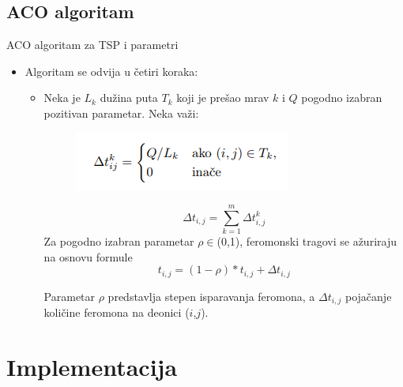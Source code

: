 \documentclass[11pt]{beamer}
\begin{document}
\subsection{ACO algoritam}
\begin{frame}{ACO algoritam za TSP i parametri}
\begin{itemize}
  		\item Algoritam se odvija u četiri koraka:
  		\begin{itemize} 
		\item Neka je $L_{k}$ dužina puta $T_{k}$ koji je prešao mrav $k$ i $Q$ 		pogodno izabran pozitivan parametar. Neka važi: 

		\begin{figure}[h!]
		\begin{center}
			\includegraphics[scale=0.5]{formula.png}
		\end{center}
		\label{fig:formula}
		\end{figure}

		\begin{equation}\label{4}
		\Delta t_{i,j}  = \sum_{k=1}^{m} \Delta t^k_{i,j}
		\end{equation}
		Za pogodno izabran parametar $\rho \in$(0,1), feromonski tragovi se 			ažuriraju na osnovu formule  
		\begin{equation}\label{3}
			t_{i,j} = (1-\rho) * t_{i,j} + \Delta t_{i,j}
		\end{equation}
		
		Parametar $\rho$ predstavlja stepen isparavanja feromona, a $\Delta 			t_{i,j}$ pojačanje količine feromona na deonici ($i$,$j$).

  		

  		\end{itemize} 
\end{itemize} 
\end{frame}

\section{Implementacija}
\end{document}
